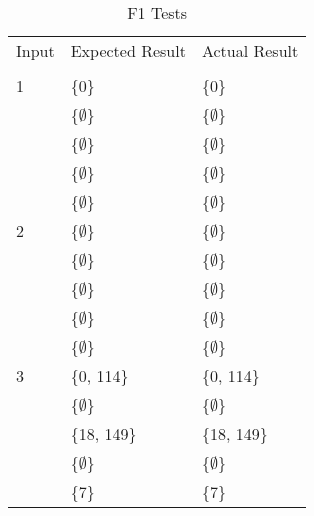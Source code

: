 \documentclass[12pt, titlepage]{article}
\begin{document}
\begin{table}[h!]
\centering
\begin{tabular}{ p{7cm}  p{4cm}  p{4cm} }
	Input &Expected Result &Actual Result\\\\ \hline
	1 &\{0\}  &\{0\}\\ 
	~ &\{$\emptyset$\} &\{$\emptyset$\}\\
	~ &\{$\emptyset$\} &\{$\emptyset$\}\\
	~ &\{$\emptyset$\} &\{$\emptyset$\}\\
	~ &\{$\emptyset$\} &\{$\emptyset$\}\\ \hline
	2 &\{$\emptyset$\} &\{$\emptyset$\}\\ 
	~ &\{$\emptyset$\} &\{$\emptyset$\}\\
	~ &\{$\emptyset$\} &\{$\emptyset$\}\\
	~ &\{$\emptyset$\} &\{$\emptyset$\}\\
	~ &\{$\emptyset$\} &\{$\emptyset$\}\\ \hline
	3 &\{0, 114\}  &\{0, 114\}\\ 
	~ &\{$\emptyset$\} &\{$\emptyset$\}\\
	~ &\{18, 149\} &\{18, 149\}\\
	~ &\{$\emptyset$\} &\{$\emptyset$\}\\
	~ &\{7\} &\{7\}\\ \hline
\end{tabular}
\caption{F1 Tests}
\label{table:F1 Tests}
\end{table}
\end{document}

